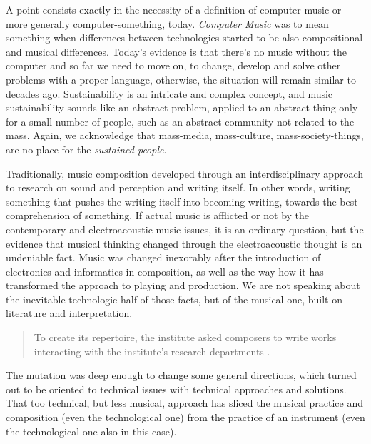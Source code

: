 \documentclass[twoside,a4paper]{article}
\begin{document}
A point consists exactly in the necessity of a definition of computer music or
more generally computer-something, today. \emph{Computer Music} was to mean
something when differences between technologies started to be also compositional
and musical differences. Today's evidence is that there's no music without the
computer and so far we need to move on, to change, develop and solve other
problems with a proper language, otherwise, the situation will remain similar to
decades ago. Sustainability is an intricate and complex concept, and music
sustainability sounds like an abstract problem, applied to an abstract thing
only for a small number of people, such as an abstract community not related to
the mass. Again, we acknowledge that mass-media, mass-culture, mass-society-things,
are no place for the \emph{sustained people}.

Traditionally, music composition developed through an interdisciplinary approach
to research on sound and perception and writing itself. In other words, writing
something that pushes the writing itself into becoming writing, towards the best
comprehension of something. If actual music is afflicted or not by the contemporary
and electroacoustic music issues, it is an ordinary question, but the evidence
that musical thinking changed through the electroacoustic thought is an undeniable
fact. Music was changed inexorably after the introduction of electronics and
informatics in composition, as well as the way how it has transformed the approach
to playing and production. We are not speaking about the inevitable technologic
half of those facts, but of the musical one, built on literature and interpretation.

\begin{quote}
To create its repertoire, the institute asked composers to write works interacting
with the institute's research departments \cite{lem16}.
\end{quote}

The mutation was deep enough to change some general directions, which turned out
to be oriented to technical issues with technical approaches and solutions. That
too technical, but less musical, approach has sliced the musical practice and
composition (even the technological one) from the practice of an instrument (even
the technological one also in this case).

\end{document}
